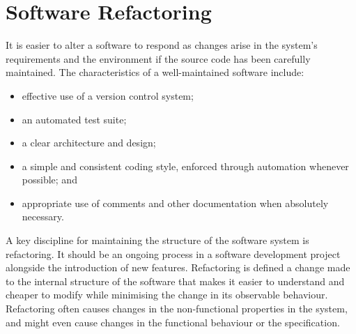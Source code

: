 \documentclass[a4paper, openany]{memoir}
\begin{document}
\chapter{Software Refactoring}
It is easier to alter a software to respond as changes arise in the system's requirements and the environment if the source code has been carefully maintained. The characteristics of a well-maintained software include:
\begin{itemize}
    \item effective use of a version control system;
    \item an automated test suite;
    \item a clear architecture and design;
    \item a simple and consistent coding style, enforced through automation whenever possible; and
    \item appropriate use of comments and other documentation when absolutely necessary.
\end{itemize}

A key discipline for maintaining the structure of the software system is refactoring. It should be an ongoing process in a software development project alongside the introduction of new features. Refactoring is defined a change made to the internal structure of the software that makes it easier to understand and cheaper to modify while minimising the change in its observable behaviour. Refactoring often causes changes in the non-functional properties in the system, and might even cause changes in the functional behaviour or the specification.
\end{document}
